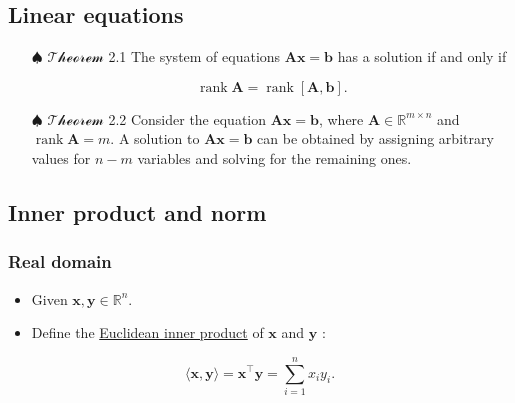 \documentclass[12pt,thmsa]{article}
\begin{document}
\subsection{Linear equations}
\begin{itemize}
	\item[\(\spadesuit\)] \(\mathcal{Theorem}\) 2.1 The system of equations \(\boldsymbol{A} \boldsymbol{x}=\boldsymbol{b}\) has a solution if and only if
	
	\begin{equation*}
		\operatorname{rank} \boldsymbol{A}=\operatorname{rank}[\boldsymbol{A}, \boldsymbol{b}] .
	\end{equation*}

	\item[\(\spadesuit\)] \(\mathcal{Theorem}\) 2.2 Consider the equation \(\boldsymbol{A x}=\boldsymbol{b}\), where \(\boldsymbol{A} \in \mathbb{R}^{m \times n}\) and \(\operatorname{rank} \boldsymbol{A}=m\). A solution to \(\boldsymbol{A} \boldsymbol{x}=\boldsymbol{b}\) can be obtained by assigning arbitrary values for \(n-m\) variables and solving for the remaining ones.
\end{itemize}	

\subsection{Inner product and norm}
\subsubsection{Real domain}
\begin{itemize}
	\item Given \(\boldsymbol{x}, \boldsymbol{y} \in \mathbb{R}^{n}\).
	
	\item Define the \underline{Euclidean inner product} of \(\boldsymbol{x}\) and \(\boldsymbol{y}\) :
	
\end{itemize}

\begin{equation*}
	\langle\boldsymbol{x}, \boldsymbol{y}\rangle=\boldsymbol{x}^{\top} \boldsymbol{y}=\sum_{i=1}^{n} x_{i} y_{i}.
\end{equation*}
\end{document}
